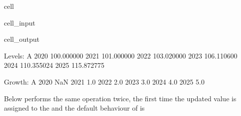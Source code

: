 \documentclass[letterpaper,10pt,english]{jupyterBook}
\begin{document}
\begin{sphinxuseclass}{cell}\begin{sphinxVerbatimInput}

\begin{sphinxuseclass}{cell_input}
\begin{sphinxVerbatim}[commandchars=\\\{\}]
    
\end{sphinxVerbatim}

\end{sphinxuseclass}\end{sphinxVerbatimInput}
\begin{sphinxVerbatimOutput}

\begin{sphinxuseclass}{cell_output}
\begin{sphinxVerbatim}[commandchars=\\\{\}]
Levels:
               A
2020  100.000000
2021  101.000000
2022  103.020000
2023  106.110600
2024  110.355024
2025  115.872775

Growth:
        A
2020  NaN
2021  1.0
2022  2.0
2023  3.0
2024  4.0
2025  5.0
\end{sphinxVerbatim}

\end{sphinxuseclass}\end{sphinxVerbatimOutput}

\end{sphinxuseclass}
\sphinxAtStartPar
{}

\sphinxAtStartPar
Below performs the same operation twice, the first time the updated value is assigned to the   and the default behaviour of  is 
\end{document}
